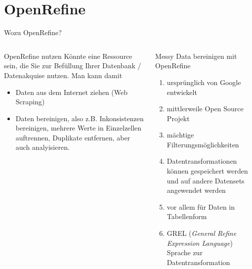 
\section{OpenRefine}
\begin{frame}[allowframebreaks]{Wozu OpenRefine?}
 
\begin{columns}
  \begin{block}{OpenRefine nutzen}\footnotesize 
  Könnte eine Ressource sein, die Sie zur Befüllung Ihrer Datenbank / Datenakquise nutzen.
Man kann damit 
\begin{itemize}
    \item Daten aus dem Internet ziehen (\alert{Web Scraping})
    \item Daten bereinigen, also z.B. Inkonsistenzen bereinigen, mehrere Werte in Einzelzellen auftrennen, Duplikate entfernen, aber auch analyisieren. 
\end{itemize}
\end{block}

\begin{alertblock}{\small Messy Data bereinigen mit OpenRefine}
  \begin{enumerate}\footnotesize 
    \item ursprünglich von Google entwickelt 
    \item mittlerweile Open Source Projekt 
    \item mächtige Filterungsmöglichkeiten
    \item Datentransformationen können gespeichert werden und auf andere Datensets angewendet werden 
    \item vor allem für Daten in Tabellenform
    \item GREL (\emph{General Refine Expression Language}) Sprache zur Datentransformation
 \end{enumerate}
\end{alertblock}
\end{columns}
\end{frame}


